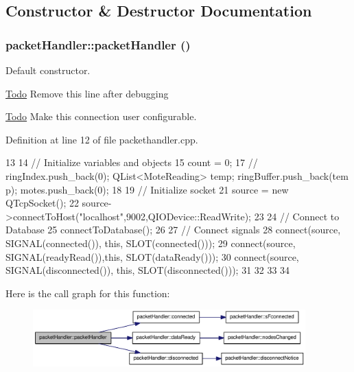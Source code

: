 \subsection{Constructor \& Destructor Documentation}
\hypertarget{classpacketHandler_a02936b9105618ed38701274efcfa0dfb}{
\subsubsection[{packetHandler}]{\setlength{\rightskip}{0pt plus 5cm}packetHandler::packetHandler ()}}
\label{classpacketHandler_a02936b9105618ed38701274efcfa0dfb}


Default constructor. 



\begin{Desc}
\item[\hyperlink{todo__todo000005}{Todo}]Remove this line after debugging \end{Desc}


\begin{Desc}
\item[\hyperlink{todo__todo000006}{Todo}]Make this connection user configurable. \end{Desc}




Definition at line 12 of file packethandler.cpp.




\begin{DoxyCode}
13 {
14     // Initialize variables and objects
15     count = 0;
17 //    ringIndex.push_back(0);   QList<MoteReading> temp; ringBuffer.push_back(tem
      p); motes.push_back(0);
18 
19     // Initialize socket
21     source = new QTcpSocket();
22     source->connectToHost("localhost",9002,QIODevice::ReadWrite);
23 
24     // Connect to Database
25     connectToDatabase();
26 
27     // Connect signals
28     connect(source, SIGNAL(connected()), this, SLOT(connected()));
29     connect(source, SIGNAL(readyRead()),this, SLOT(dataReady()));
30     connect(source, SIGNAL(disconnected()), this, SLOT(disconnected()));
31 
32 
33 
34 }
\end{DoxyCode}




Here is the call graph for this function:\nopagebreak
\begin{figure}[H]
\begin{center}
\leavevmode
\includegraphics[width=298pt]{classpacketHandler_a02936b9105618ed38701274efcfa0dfb_cgraph}
\end{center}
\end{figure}




